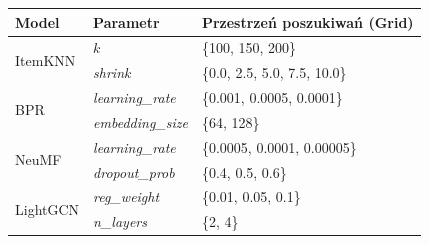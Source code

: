 \begin{tabular}{|l|l|l|}
    \hline
    \textbf{Model}            & \textbf{Parametr}        & \textbf{Przestrzeń poszukiwań (Grid)} \\ \hline
    \multirow{2}{*}{ItemKNN}  & $k$                      & \{100, 150, 200\}                     \\ \cline{2-3}
                              & \textit{shrink}          & \{0.0, 2.5, 5.0, 7.5, 10.0\}          \\ \hline
    \multirow{2}{*}{BPR}      & \textit{learning\_rate}  & \{0.001, 0.0005, 0.0001\}             \\ \cline{2-3}
                              & \textit{embedding\_size} & \{64, 128\}                           \\ \hline
    \multirow{2}{*}{NeuMF}    & \textit{learning\_rate}  & \{0.0005, 0.0001, 0.00005\}           \\ \cline{2-3}
                              & \textit{dropout\_prob}   & \{0.4, 0.5, 0.6\}                     \\ \hline
    \multirow{2}{*}{LightGCN} & \textit{reg\_weight}     & \{0.01, 0.05, 0.1\}                   \\ \cline{2-3}
                              & \textit{n\_layers}       & \{2, 4\}                              \\ \hline
\end{tabular}
